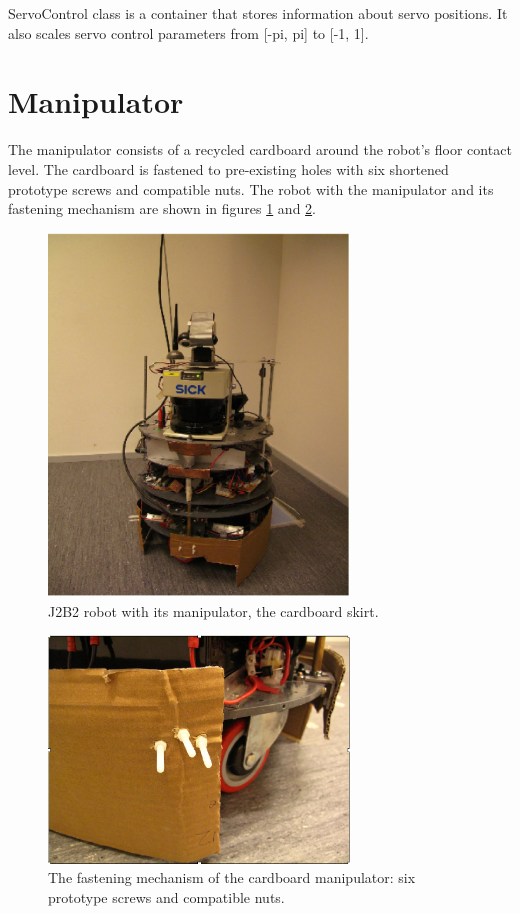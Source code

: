 \documentclass[a4paper,10pt]{article}
\begin{document}
ServoControl class is a container that stores information about servo positions. It also scales servo control parameters from [-pi, pi] to [-1, 1].

\section{Manipulator}

The manipulator consists of a recycled cardboard around the robot's floor contact level. The cardboard is fastened to pre-existing holes with six shortened prototype screws and compatible nuts. The robot with the manipulator and its fastening mechanism are shown in figures \ref{j2b2} and \ref{screws}.

\begin{figure}[h]	%
\begin{center}
\includegraphics[width=8.0cm]{j2b2.eps}
\caption{J2B2 robot with its manipulator, the cardboard skirt.}
\label{j2b2} %
\end{center}
\end{figure}

\begin{figure}[!]	%
\begin{center}
\includegraphics[width=8.0cm]{screws.eps}
\caption{The fastening mechanism of the cardboard manipulator: six prototype screws and compatible nuts.}
\label{screws} %
\end{center}
\end{figure}
\end{document}
